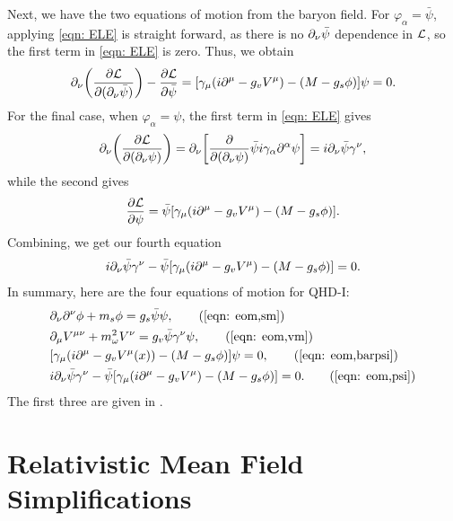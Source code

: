 Next, we have the two equations of motion from the baryon field. For $\varphi_\alpha = \bar\psi$, applying \eqref{eqn: ELE} is straight forward, as there is no $\partial_\nu \bar\psi$ dependence in $\mathcal{L}$, so the first term in \eqref{eqn: ELE} is zero. Thus, we obtain
\begin{align}\label{eqn: eom,barpsi}
    \p_\nu \pqty{\pdv{\Lag}{(\p_\nu \bar\psi)}}  - \pdv{\Lag}{\bar\psi} = \bqty{\gamma_\mu(i\p^\mu - g_v V^\mu) - (M-g_s\phi)} \psi = 0.
\end{align}
For the final case, when $\varphi_\alpha = \psi$, the first term in \eqref{eqn: ELE} gives
\begin{align*}
    \p_\nu \pqty{\pdv{\Lag}{(\p_\nu \psi)}} = \p_\nu\bqty{\pdv{}{(\p_\nu\psi)}\bar\psi i \gamma_\alpha \p^\alpha \psi} = i\p_\nu \bar\psi \gamma^\nu,
\end{align*}
while the second gives
\begin{align*}
    \pdv{\Lag}{\psi} = \bar\psi\bqty{\gamma_\mu(i\p^\mu - g_v V^\mu) - (M-g_s\phi)}.
\end{align*}
Combining, we get our fourth equation
\begin{align}\label{eqn: eom,psi}
    i \p_\nu \bar\psi \gamma^\nu -\bar\psi\bqty{\gamma_\mu(i\p^\mu - g_v V^\mu) - (M-g_s\phi)} = 0.
\end{align}
In summary, here are the four equations of motion for QHD-I:
\begin{align*}
    &\p_\nu \p^\nu \phi + m_s\phi = g_s\bar{\psi}\psi,\tag{\ref{eqn: eom,sm}}\\
    &\p_\mu V^{\mu\nu} + m_\omega^2 V^\nu = g_v \bar\psi \gamma^\nu \psi,\tag{\ref{eqn: eom,vm}}\\
    &\bqty{\gamma_\mu(i\p^\mu -g_v V^\mu(x)) - (M-g_s\phi)} \psi = 0,\tag{\ref{eqn: eom,barpsi}}\\
    & i \p_\nu \bar\psi \gamma^\nu -\bar\psi\bqty{\gamma_\mu(i\p^\mu - g_v V^\mu) - (M-g_s\phi)} = 0. \tag{\ref{eqn: eom,psi}}
\end{align*}
The first three are given in \autocite{diener_2008}.

\section{Relativistic Mean Field Simplifications}

